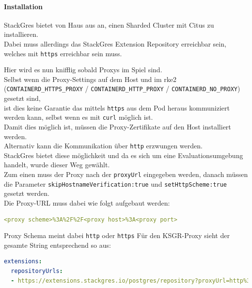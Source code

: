 \begin{flushleft}
    \paragraph{Installation}
    StackGres bietet von Haus aus an, einen Sharded Cluster mit Citus zu installieren.\\
    Dabei muss allerdings das StackGres Extension Repository erreichbar sein, welches mit \texttt{https} erreichbar sein muss.
\end{flushleft}
\begin{flushleft}
    Hier wird es nun knifflig sobald Proxys im Spiel sind.\\
    Selbst wenn die Proxy-Settings auf dem Host und im \gls{rke2} (\texttt{CONTAINERD\_HTTPS\_PROXY} / \texttt{CONTAINERD\_HTTP\_PROXY} / \texttt{CONTAINERD\_NO\_PROXY}) gesetzt sind,\\
    ist dies keine Garantie das mittels \texttt{https} aus dem Pod heraus kommuniziert werden kann, selbst wenn es mit \texttt{curl} möglich ist.\\
    Damit dies möglich ist, müssen die Proxy-Zertifikate auf den Host installiert werden.\\
    Alternativ kann die Kommunikation über \texttt{http} erzwungen werden.\\
    StackGres bietet diese möglichkeit und da es sich um eine Evaluationsumgebung handelt, wurde dieser Weg gewählt.\\
    Zum einen muss der Proxy nach der \texttt{proxyUrl} eingegeben werden, danach müssen die Parameter \texttt{skipHostnameVerification:true} und \texttt{setHttpScheme:true} gesetzt werden.\\
    Die Proxy-URL muss dabei wie folgt aufgebaut werden:
\lstset{style=gra_codestyle}
\begin{lstlisting}[language=yaml, caption=StackGres - values.yaml - Extension proxyUrl,captionpos=b,label={lst:stackgres_extension_proxyurl},breaklines=true]
<proxy scheme>%3A%2F%2F<proxy host>%3A<proxy port>
\end{lstlisting}
    Proxy Schema meint dabei \texttt{http} oder \texttt{https}
    Für den KSGR-Proxy sieht der gesamte String entsprechend so aus:
\lstset{style=gra_codestyle}
\begin{lstlisting}[language=yaml, caption=StackGres - values.yaml - Extension Proxy,captionpos=b,label={lst:stackgres_extension_proxy},breaklines=true]
extensions:
  repositoryUrls:
  - https://extensions.stackgres.io/postgres/repository?proxyUrl=http%3A%2F%2Fsproxy.sivc.first-it.ch%3A8080?skipHostnameVerification:true&setHttpScheme:true
\end{lstlisting}
\end{flushleft}
